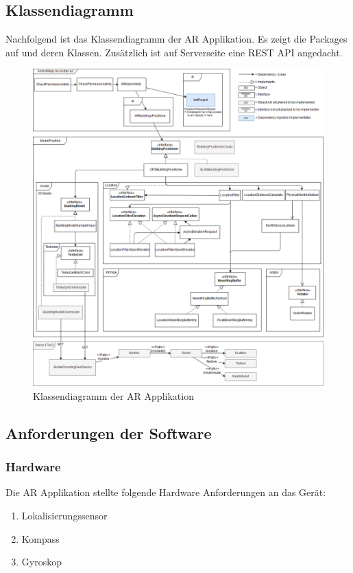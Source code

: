 \documentclass[a4paper]{scrreprt}
\begin{document}
\clearpage
\subsection{Klassendiagramm}
Nachfolgend ist das Klassendiagramm der AR Applikation. Es zeigt die Packages auf und deren Klassen. Zusätzlich ist auf Serverseite eine REST API angedacht.

\begin{figure}[h!]
	\center
	\includegraphics[width=\textwidth]{Klassendiagramm.png}
	\caption{Klassendiagramm der AR Applikation}
\end{figure}


\subsection{Anforderungen der Software}

\subsubsection{Hardware}

Die AR Applikation stellte folgende Hardware Anforderungen an das Gerät:

\begin{enumerate}
	\item Lokalisierungssensor
	\item Kompass
	\item Gyroskop
\end{enumerate}
\end{document}

